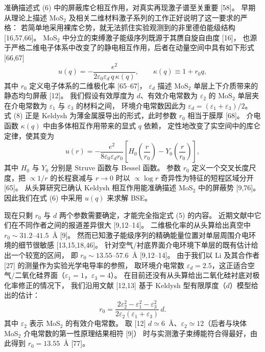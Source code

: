 \documentclass[11pt,a4paper]{ctexart}
\newcommand{\eps}{\varepsilon}
\begin{document}
准确描述式 (6) 中的屏蔽库仑相互作用，对真实再现激子谱至关重要 [58]。
早期从理论上描述 MoS$_2$ 及相关二维材料激子系列的工作正好说明了这一要求的严格：
若简单地采用裸库仑势，就无法抓住实验观测到的非里德伯能级结构 [16,57,66]。
MoS$_2$ 中分立的束缚激子能级序列既源于其赝自旋自由度 [16]，
也源于严格二维电子体系中改变了的静电相互作用，后者在动量空间中具有如下形式 [66,67]
\begin{equation}
u(q)=-\frac{e^2}{2\eps_0\eps_d\,q\,\kappa(q)},
\qquad \kappa(q)\equiv1+r_0q ,
\end{equation}
其中 $r_0$ 定义电子体系的二维极化率 [65--67]，
$\eps_d$ 描述 MoS$_2$ 单层上下介质带来的静态均匀屏蔽 [12]。
我们假设有效厚度为 $d$、有效介电常数为 $\eps_2$ 的 MoS$_2$ 单层夹在介电常数为 $\eps_1$ 与 $\eps_3$ 的材料之间，
环境介电常数因此为 $\eps_d=(\eps_1+\eps_3)/2$。
式 (8) 正是 Keldysh 为薄金属膜导出的形式，此时参数 $r_0$ 相当于膜厚 [68]。
介电函数 $\kappa(q)$ 中由多体相互作用带来的显式 $q$ 依赖，
定性地改变了实空间中的库仑定律，使其变为
\begin{equation}
u(r)=-\frac{e^2}{8\eps_0\eps_d r_0}
\left[H_0\!\left(\frac{r}{r_0}\right)-Y_0\!\left(\frac{r}{r_0}\right)\right],
\end{equation}
其中 $H_0$ 与 $Y_0$ 分别是 Struve 函数与 Bessel 函数。
参数 $r_0$ 定义一个交叉长度尺度，把 $\propto1/r$ 的长程衰减与
$r\to0$ 时以 $\propto\log r$ 奇异性为特征的短程区域分开 [65]。
从头算研究已确认 Keldysh 相互作用能准确描述 MoS$_2$ 中的屏蔽势 [9,76]。
因此我们在式 (6) 中采用 $u(q)$ 来求解 BSE。

现在只剩 $r_0$ 与 $d$ 两个参数需要确定，才能完全指定式 (5) 的内容。
近期文献中它们在不同作者之间的报道差异很大 [9,12--14]。
二维极化率的从头算给出真空中 $r_0\sim31.2$--$41.5$~\AA{} [9]。
然而已知激子能级序列的精确能量位置对单层周围介电环境的细节很敏感 [13,15,18,46]。
针对空气/衬底界面介电环境下单层的既有估计给出一个较宽的区间，
即 $r_0\sim13.55$--$57.6$~\AA{} [9,12--14]。
由于我们以 Li 及其合作者 [27] 的测量作为实验光学电导率的参照，
取环境介电常数 $\eps_d=2.5$，这正适合空气/二氧化硅界面（$\eps_1=1$，$\eps_3=4$）。
在目前还没有从头算给出二氧化硅衬底对极化率修正的情况下，
我们沿用文献 [12,13] 基于 Keldysh 型有限厚度（$d$）模型给出的估计：
\begin{equation}
r_0=\frac{2\eps_2^2-\eps_1^2-\eps_3^2}{2\eps_2(\eps_1+\eps_3)}\,d .
\end{equation}
其中 $\eps_2$ 表示 MoS$_2$ 的有效介电常数。
取 [12] $d\simeq6$~\AA{}、$\eps_2\simeq12$（后者与块体 MoS$_2$ 介电常数的第一性原理结果相符 [9]）
时与实测激子束缚能符合得最好，由此得到 $r_0=13.55$~\AA{} [77]。
\end{document}
